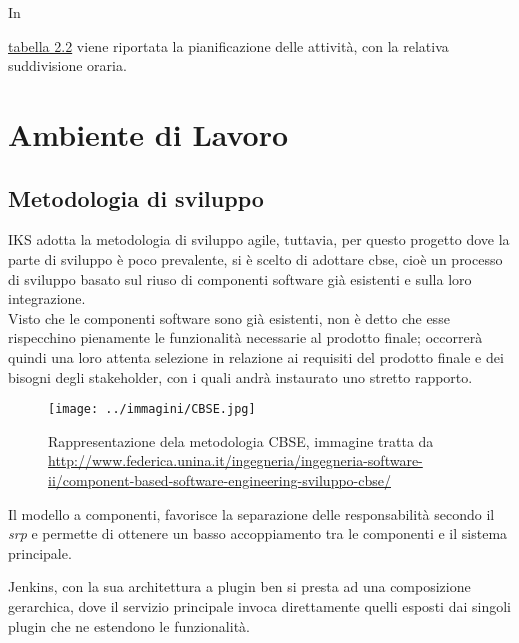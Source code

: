 In {\hyperref[tab:initial-plan]{tabella 2.2} viene riportata la pianificazione delle attività, con la relativa suddivisione oraria.



\newpage

\section{Ambiente di Lavoro}

\subsection{Metodologia di sviluppo}

IKS adotta la metodologia di sviluppo \gls{agile}, tuttavia, per questo progetto dove la parte di sviluppo è poco prevalente, si è scelto di adottare \gls{cbse}, cioè un processo di sviluppo basato sul riuso di componenti software già esistenti e sulla loro integrazione. \\ 
Visto che le componenti software sono già esistenti, non è detto che esse rispecchino pienamente le funzionalità necessarie al prodotto finale; occorrerà quindi una loro attenta selezione in relazione ai requisiti del prodotto finale e dei bisogni degli \gls{stakeholder}, con i quali andrà instaurato uno stretto rapporto.

\begin{figure}[H]
    \capstart
    \captionsetup{justification=centering}
    \centering
    \texttt{[image: ../immagini/CBSE.jpg]}
    \caption[Rappresentazione dela metodologia CBSE]{Rappresentazione dela metodologia CBSE, immagine tratta da \url{http://www.federica.unina.it/ingegneria/ingegneria-software-ii/component-based-software-engineering-sviluppo-cbse/}}
\end{figure}

Il modello a componenti, favorisce la separazione delle responsabilità secondo il \textit{\gls{srp}} e permette di ottenere un basso accoppiamento tra le componenti e il sistema principale.

Jenkins, con la sua architettura a \gls{plugin} ben si presta ad una composizione gerarchica, dove il servizio principale invoca direttamente quelli esposti dai singoli \gls{plugin} che ne estendono le funzionalità.

}
